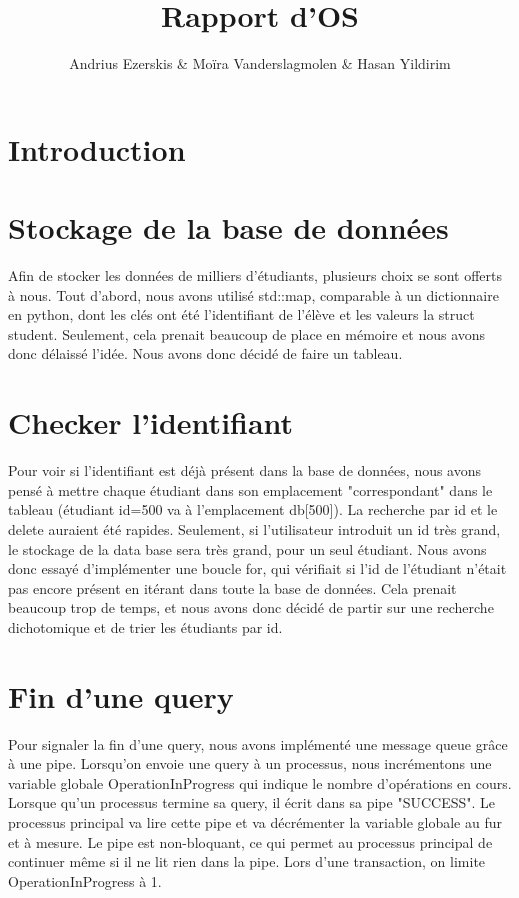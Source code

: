 \documentclass[utf8]{article}
\begin{document}
\begin{titlepage}
    

\author{Andrius Ezerskis \& Moïra Vanderslagmolen \& Hasan Yildirim}
\title{Rapport d'OS}

\maketitle
\end{titlepage}

\section{Introduction}

\section{Stockage de la base de données}
\indent{}
\par
Afin de stocker les données de milliers d'étudiants, plusieurs choix se sont offerts à nous. 
Tout d'abord, nous avons utilisé std::map, comparable à un dictionnaire en python, dont les
clés ont été l'identifiant de l'élève et les valeurs la struct student. Seulement, cela
prenait beaucoup de place en mémoire et nous avons donc délaissé l'idée. Nous avons donc décidé de faire un tableau.
\par
\section{Checker l'identifiant}
\indent{}
\par
Pour voir si l'identifiant est déjà présent dans la base de données, nous avons pensé à mettre chaque étudiant
dans son emplacement "correspondant" dans le tableau (étudiant id=500 va à l'emplacement db[500]). La recherche par id et le delete auraient été rapides.
Seulement, si l'utilisateur introduit un id très grand, le stockage de la data base sera très grand, pour un seul étudiant.
Nous avons donc essayé d'implémenter une boucle for, qui vérifiait si l'id de l'étudiant n'était pas encore présent en itérant dans toute la base de données.
Cela prenait beaucoup trop de temps, et nous avons donc décidé de partir sur une recherche dichotomique et de trier les étudiants par id.
\par
\section{Fin d'une query}
\indent{}
\par
Pour signaler la fin d'une query, nous avons implémenté une message queue grâce à une pipe. Lorsqu'on envoie 
une query à un processus, nous incrémentons une variable globale OperationInProgress qui indique le nombre d'opérations en cours.
Lorsque qu'un processus termine sa query, il écrit dans sa pipe "SUCCESS". Le processus principal va lire cette pipe et va décrémenter
la variable globale au fur et à mesure. Le pipe est non-bloquant, ce qui permet au processus principal de continuer
même si il ne lit rien dans la pipe. Lors d'une transaction, on limite OperationInProgress à 1.
\end{document}

